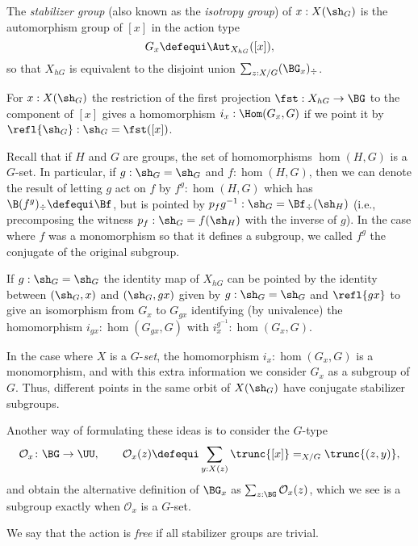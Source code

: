 The \emph{stabilizer group}
(also known as the \emph{isotropy group}) of
$x : X(\sh_G)$ is the automorphism group of $[x]$ in the action type
$$G_x\defequi\Aut_{X_{hG}}([x]),$$
so that
$X_{hG}$ is equivalent to the disjoint union $\sum_{z:X/G}(\BG_x)_\div$.


  For $x:X(\sh_G)$ the restriction of the first projection $\fst:X_{hG}\to\BG$ to the component of $[x]$ gives a homomorphism $i_x:\Hom(G_x,G)$ if we point it by $\refl{\sh_G}:\sh_G=\fst([x])$.

  Recall that if $H$ and $G$ are groups, the set of homomorphisms $\hom(H,G)$ is a $G$-set.  In particular, if $g:\sh_G=\sh_G$ and $f:\hom(H,G)$, then we can denote the result of letting $g$ act on $f$ by $f^g:\hom(H,G)$ which has $\B(f^g)_\div\defequi\Bf$, but is pointed by $p_fg^{-1}:\sh_G=\Bf_\div(\sh_H)$ (i.e., precomposing the witness $p_f:\sh_G=f(\sh_H)$ with the inverse of $g$).  In the case where $f$ was a monomorphism so that it defines a subgroup, we called $f^g$ the conjugate of the original subgroup.
  
 If $g:\sh_G=\sh_G$ the identity map of $X_{hG}$ can be pointed by the identity between $(\sh_G,x) $ and $(\sh_G,gx)$ given by $g:\sh_G=\sh_G$ and $\refl{gx}$ to give an isomorphism from $G_x$ to $G_{gx}$ identifying (by univalence) the homomorphism $i_{gx}:\hom(G_{gx},G)$ with $i^{g^{-1}}_x:\hom(G_x,G)$.


In the case where $X$ is a $G$-\emph{set}, the homomorphism $i_x:\hom(G_x,G)$ is a monomorphism, and with this extra information we consider $G_x$ as a subgroup of $G$.
Thus, different points in the same orbit of $X(\sh_G)$ have conjugate stabilizer subgroups.

Another way of formulating these ideas is to consider the $G$-type
\[
  \mathcal O_x\colon\BG\to\UU,\qquad
  \mathcal O_x(z)\defequi\sum_{y:X(z)}\trunc{[x]}=_{X/G}\trunc{(z,y)},
\]
and obtain the alternative definition of $\BG_x$ as $\sum_{z:\BG}\mathcal O_x(z)$, which we see is a subgroup exactly when $\mathcal O_x$ is a $G$-set.

We say that the action is \emph{free} if all stabilizer groups are trivial.

